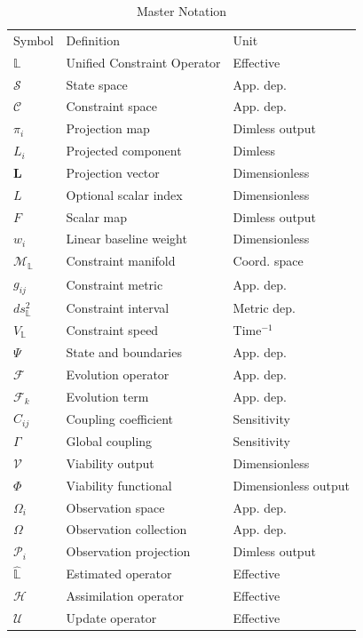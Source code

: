 \begin{table}[tb]
\caption{\label{tab:master_notation}Master Notation}
\footnotesize
\begin{ruledtabular}
\begin{tabular}{lll}
Symbol & Definition & Unit \\
\(\mathbb{L}\) & Unified Constraint Operator & Effective \\
\(\mathcal{S}\) & State space & App. dep. \\
\(\mathcal{C}\) & Constraint space & App. dep. \\
\(\pi_i\) & Projection map & Dimless output \\
\(L_i\) & Projected component & Dimless \\
\(\mathbf{L}\) & Projection vector & Dimensionless \\
\(L\) & Optional scalar index & Dimensionless \\
\(F\) & Scalar map & Dimless output \\
\(w_i\) & Linear baseline weight & Dimensionless \\
\(\mathcal{M}_{\mathbb{L}}\) & Constraint manifold & Coord. space \\
\(g_{ij}\) & Constraint metric & App. dep. \\
\(ds_{\mathbb{L}}^2\) & Constraint interval & Metric dep. \\
\(V_{\mathbb{L}}\) & Constraint speed & Time\(^{-1}\) \\
\(\Psi\) & State and boundaries & App. dep. \\
\(\mathcal{F}\) & Evolution operator & App. dep. \\
\(\mathcal{F}_k\) & Evolution term & App. dep. \\
\(C_{ij}\) & Coupling coefficient & Sensitivity \\
\(\Gamma\) & Global coupling & Sensitivity \\
\(\mathcal{V}\) & Viability output & Dimensionless \\
\(\Phi\) & Viability functional & Dimensionless output \\
\(\Omega_i\) & Observation space & App. dep. \\
\(\Omega\) & Observation collection & App. dep. \\
\(\mathcal{P}_i\) & Observation projection & Dimless output \\
\(\hat{\mathbb{L}}\) & Estimated operator & Effective \\
\(\mathcal{H}\) & Assimilation operator & Effective \\
\(\mathcal{U}\) & Update operator & Effective \\
\end{tabular}
\end{ruledtabular}
\end{table}
